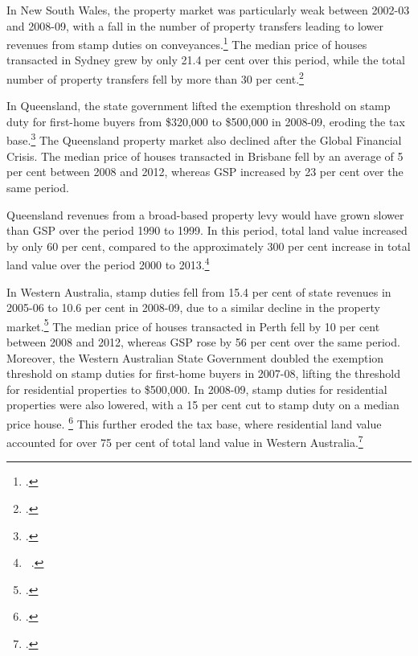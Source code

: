 \begin{subappendices}
In New South Wales, the property market was particularly weak between 2002-03 and  2008-09, with a fall in the number of property transfers leading to lower revenues from stamp duties on conveyances.\footcite[][18]{CGC2009a}  The median price of houses transacted in Sydney grew by only 21.4 per cent over this period, while the total number of property transfers fell by more than 30 per cent.\footcite{ABS2015ResidentialPropertyIndex}  

In Queensland, the state government lifted the exemption threshold on stamp duty for first-home buyers from \$320,000 to \$500,000 in 2008-09, eroding the tax base.\footcite{TreasuryTradeQld2012}  The Queensland property market also declined after the Global Financial Crisis. The median price of houses transacted in Brisbane fell by an average of 5 per cent between 2008 and 2012, whereas GSP increased by 23 per cent over the same period.  

Queensland revenues from a broad-based property levy would have grown slower than GSP over the period 1990 to 1999. In this period, total land value increased by only 60 per cent, compared to the approximately 300 per cent increase in total land value over the period 2000 to 2013.\footnote{\gao\ \textcite{ABS2014e}.}

In Western Australia, stamp duties fell from 15.4 per cent of state revenues in 2005-06 to 10.6 per cent in 2008-09, due to a similar decline in the property market.\footcite[][13]{CGC2010b}   The median price of houses transacted in Perth fell by 10 per cent between 2008 and 2012, whereas GSP rose by 56 per cent over the same period. Moreover, the Western Australian State Government doubled the exemption threshold on stamp duties for first-home buyers in 2007-08, lifting the threshold for residential properties to \$500,000.  In 2008-09, stamp duties for residential properties were also lowered, with a 15 per cent cut to stamp duty on a median price house. \footcite{Treasury2007a}   This further eroded the tax base, where residential land value accounted for over 75 per cent of total land value in Western Australia.\footcite{Treasury2008a}

\clearpage
\newcommand{\propPhantomNotes}{
{\color{white}
\notes{‘Property levy’ shows the revenues that would have been raised with a broad-based property levy of 0.2 per cent applied to unimproved land values had it been in place over the period.}

\source{\textcites{ABSmultipleyears}{ABS2014e}; Grattan analysis.}}
}


\end{subappendices}
